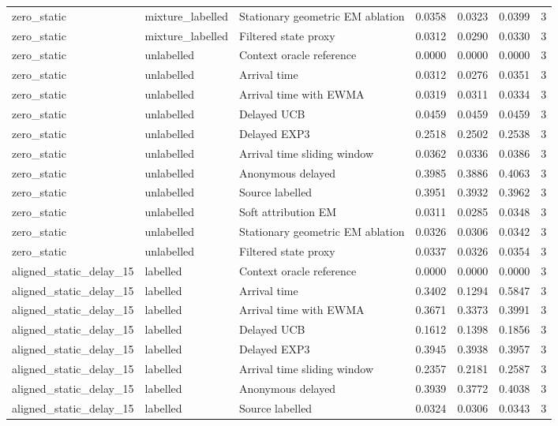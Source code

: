 \begin{tabular}{llllllr}
zero\_static & mixture\_labelled & Stationary geometric EM ablation & 0.0358 & 0.0323 & 0.0399 & 3 \\
zero\_static & mixture\_labelled & Filtered state proxy & 0.0312 & 0.0290 & 0.0330 & 3 \\
zero\_static & unlabelled & Context oracle reference & 0.0000 & 0.0000 & 0.0000 & 3 \\
zero\_static & unlabelled & Arrival time & 0.0312 & 0.0276 & 0.0351 & 3 \\
zero\_static & unlabelled & Arrival time with EWMA & 0.0319 & 0.0311 & 0.0334 & 3 \\
zero\_static & unlabelled & Delayed UCB & 0.0459 & 0.0459 & 0.0459 & 3 \\
zero\_static & unlabelled & Delayed EXP3 & 0.2518 & 0.2502 & 0.2538 & 3 \\
zero\_static & unlabelled & Arrival time sliding window & 0.0362 & 0.0336 & 0.0386 & 3 \\
zero\_static & unlabelled & Anonymous delayed & 0.3985 & 0.3886 & 0.4063 & 3 \\
zero\_static & unlabelled & Source labelled & 0.3951 & 0.3932 & 0.3962 & 3 \\
zero\_static & unlabelled & Soft attribution EM & 0.0311 & 0.0285 & 0.0348 & 3 \\
zero\_static & unlabelled & Stationary geometric EM ablation & 0.0326 & 0.0306 & 0.0342 & 3 \\
zero\_static & unlabelled & Filtered state proxy & 0.0337 & 0.0326 & 0.0354 & 3 \\
aligned\_static\_delay\_15 & labelled & Context oracle reference & 0.0000 & 0.0000 & 0.0000 & 3 \\
aligned\_static\_delay\_15 & labelled & Arrival time & 0.3402 & 0.1294 & 0.5847 & 3 \\
aligned\_static\_delay\_15 & labelled & Arrival time with EWMA & 0.3671 & 0.3373 & 0.3991 & 3 \\
aligned\_static\_delay\_15 & labelled & Delayed UCB & 0.1612 & 0.1398 & 0.1856 & 3 \\
aligned\_static\_delay\_15 & labelled & Delayed EXP3 & 0.3945 & 0.3938 & 0.3957 & 3 \\
aligned\_static\_delay\_15 & labelled & Arrival time sliding window & 0.2357 & 0.2181 & 0.2587 & 3 \\
aligned\_static\_delay\_15 & labelled & Anonymous delayed & 0.3939 & 0.3772 & 0.4038 & 3 \\
aligned\_static\_delay\_15 & labelled & Source labelled & 0.0324 & 0.0306 & 0.0343 & 3 \\

\end{tabular}
